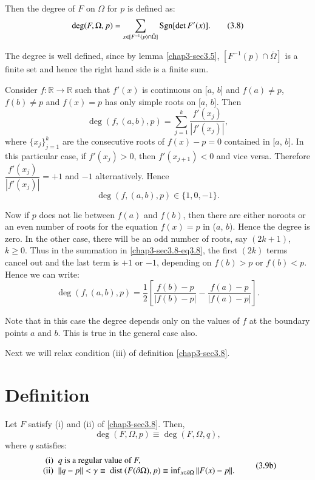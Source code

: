 Then the degree of $F$ on $\Omega$ for $p$ is defined as:
\begin{equation*}
\deg (F, \Omega , p) = \sum_{x \in [F^{-1} (p) \cap \bar{\Omega}]}
{\rm Sgn} [\det F'(x)].\tag{3.8}\label{chap3-sec3.8-eq3.8} 
\end{equation*}

\begin{note*}
The degree is well defined, since by lemma \ref{chap3-sec3.5},
$[F^{-1} (p) \cap \bar{\Omega}]$ is a finite set and hence the right
hand side is a finite sum. 
\end{note*}

\begin{example*}
Consider $f: \mathbb{R} \rightarrow \mathbb{R}$ such that $f'(x)$ is
continuous on [$a$, $b$] and $f(a) \neq p$, $f (b) \neq p$ and $f(x) = p$
has only simple roots on [$a$, $b$]. Then  
$$
\deg (f,(a,b),p) = \sum^k_{j=1} \frac{f'(x_j)}{|f' (x_j)|},
$$
where $\{ x_j \}^k_{ j=1}$ are the consecutive roots of $f(x) - p = 0$
contained in [$a$, $b$]. In this particular case, if $f'(x_j) > 0$, then
$f'(x_{j +1}) < 0$ and vice versa. Therefore
$\dfrac{f'(x_j)}{|f'(x_j)|} = + 1$ and $-1$ alternatively. Hence  
$$
\deg (f,(a,b),p) \in \{ 1,0, -1 \}.
$$

Now if $p$ does not lie between $f(a)$ and $f(b)$, then there are
either no\pageoriginale roots or an even number of roots for the
equation $f(x) = p$ 
in ($a$, $b$). Hence the degree is zero. In the other case, there will
be an odd number of roots, say $(2k+1)$, $k \geq 0$. Thus in the
summation in \eqref{chap3-sec3.8-eq3.8}, 
the first $(2k)$ terms cancel out and the last
term is $+1$ or $-1$, depending on $f(b) > p$ or $f(b) < p$. Hence we
can write: 
$$
\deg  (f,(a,b),p) = \frac{1}{2} \left[ \frac{f(b)-p}{|f(b)-p|} - \frac{f(a)
    -p}{|f(a)-p|}\right]. 
$$

Note that in this case the degree depends only on the values of $f$ at
the boundary points $a$ and $b$. This is true in the general case
also.  

Next we will relax condition (iii) of definition \ref{chap3-sec3.8}.
\end{example*}

\section{Definition}\label{chap3-sec3.9}%

Let $F$  satisfy (i) and (ii) of \eqref{chap3-sec3.8}. Then, 
\begin{equation*}
\deg (F, \Omega , p) \equiv \deg (F, \Omega, q),
\tag{3.9a}\label{chap3-sec3.9-eq3.9a} 
\end{equation*}
where $q$ satisfies:  
\begin{equation*}
\begin{array}{r@{\;\;}l}
\text{(i)} & q \text{ is a regular value of } F,\\ 
\text{(ii)} & || q-p || < \gamma \equiv \text{ dist }(F(\partial
\Omega ),p) \equiv \inf_{x \in \partial \Omega} || F(x) - p ||. 
\end{array}\tag{3.9b}\label{chap3-sec3.9-eq3.9b}
\end{equation*}

